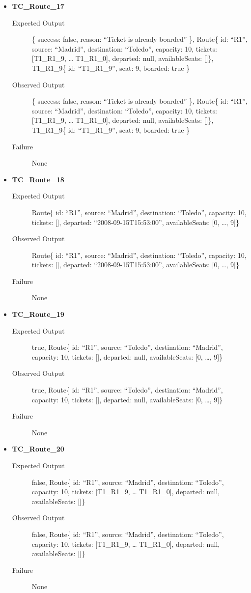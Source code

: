 \documentclass[11pt]{article}
\begin{document}
\begin{itemize}
\item \textbf{TC\_Route\_17}
\begin{description}
\item[{Expected Output}] \{ success: false, reason: “Ticket is already boarded” \},
Route\{ id: “R1”, source: “Madrid”, destination: “Toledo”, capacity: 10,  tickets: [T1\_R1\_9, … T1\_R1\_0], departed: null, availableSeats: []\}, T1\_R1\_9\{ id: “T1\_R1\_9”, seat: 9, boarded: true \}
\item[{Observed Output}] \{ success: false, reason: “Ticket is already boarded” \},
Route\{ id: “R1”, source: “Madrid”, destination: “Toledo”, capacity: 10,  tickets: [T1\_R1\_9, … T1\_R1\_0], departed: null, availableSeats: []\}, T1\_R1\_9\{ id: “T1\_R1\_9”, seat: 9, boarded: true \}
\item[{Failure}] None
\end{description}

\item \textbf{TC\_Route\_18}
\begin{description}
\item[{Expected Output}] Route\{ id: “R1”, source: “Madrid”, destination: “Toledo”, capacity: 10,  tickets: [], departed: “2008-09-15T15:53:00”, availableSeats: [0, …, 9]\}
\item[{Observed Output}] Route\{ id: “R1”, source: “Madrid”, destination: “Toledo”, capacity: 10,  tickets: [], departed: “2008-09-15T15:53:00”, availableSeats: [0, …, 9]\}
\item[{Failure}] None
\end{description}

\item \textbf{TC\_Route\_19}
\begin{description}
\item[{Expected Output}] true, Route\{ id: “R1”, source: “Toledo”, destination: “Madrid”, capacity: 10,  tickets: [], departed: null, availableSeats: [0, …, 9]\}
\item[{Observed Output}] true, Route\{ id: “R1”, source: “Toledo”, destination: “Madrid”, capacity: 10,  tickets: [], departed: null, availableSeats: [0, …, 9]\}
\item[{Failure}] None
\end{description}

\item \textbf{TC\_Route\_20}
\begin{description}
\item[{Expected Output}] false, Route\{ id: “R1”, source: “Madrid”, destination: “Toledo”, capacity: 10,  tickets: [T1\_R1\_9, … T1\_R1\_0], departed: null, availableSeats: []\}
\item[{Observed Output}] false, Route\{ id: “R1”, source: “Madrid”, destination: “Toledo”, capacity: 10,  tickets: [T1\_R1\_9, … T1\_R1\_0], departed: null, availableSeats: []\}
\item[{Failure}] None
\end{description}


\end{itemize}
\end{document}

